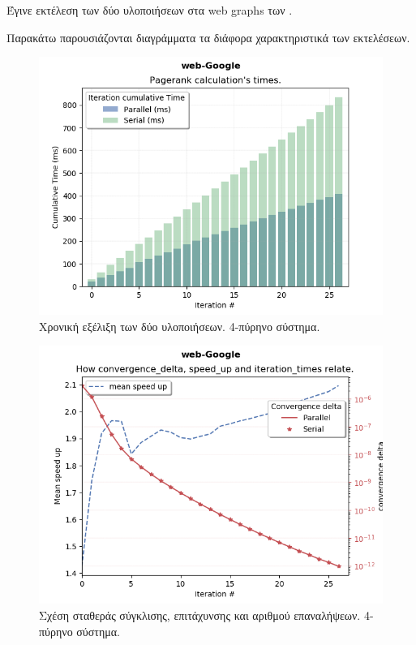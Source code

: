 Έγινε εκτέλεση των δύο υλοποιήσεων στα web graphs των \textcite{snapnets}.

Παρακάτω παρουσιάζονται διαγράμματα τα διάφορα χαρακτηριστικά των εκτελέσεων.
\begin{center}
\begin{figure}
\includegraphics[width=\linewidth]{plots/it_time.png}
\caption{Χρονική εξέλιξη των δύο υλοποιήσεων. 4-πύρηνο σύστημα.}
\end{figure}

\begin{figure}
\includegraphics[width=\linewidth]{plots/speed_up.png}
\caption{Σχέση σταθεράς σύγκλισης, επιτάχυνσης και αριθμού επαναλήψεων. 4-πύρηνο σύστημα.}
\end{figure}


\end{center}
